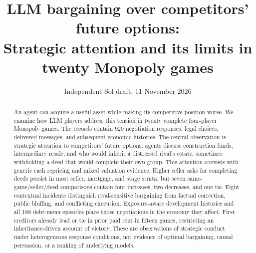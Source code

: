 \documentclass[11pt,letterpaper]{article}
\title{LLM bargaining over competitors' future options:\\Strategic attention and its limits in twenty Monopoly games}
\author{}
\date{Independent Sol draft, 11 November 2026}
\begin{document}



\maketitle
\begin{abstract}
An agent can acquire a useful asset while making its competitive position worse. We examine how LLM players address this tension in twenty complete four-player Monopoly games. The records contain 920 negotiation responses, legal choices, delivered messages, and subsequent economic histories. The central observation is strategic attention to competitors' future options: agents discuss construction funds, intermediary resale, and who would inherit a distressed rival's estate, sometimes withholding a deed that would complete their own group. This attention coexists with generic cash repricing and mixed valuation evidence. Higher seller asks for completing deeds persist in most seller, mortgage, and stage strata, but seven same-game/seller/deed comparisons contain four increases, two decreases, and one tie. Eight contextual incidents distinguish rival-sensitive bargaining from factual correction, public bluffing, and conflicting execution. Exposure-aware development histories and all 188 debt-menu episodes place those negotiations in the economy they affect. First creditors already lead or tie in prior paid rent in fifteen games, restricting an inheritance-driven account of victory. These are observations of strategic conduct under heterogeneous response conditions, not evidence of optimal bargaining, causal persuasion, or a ranking of underlying models.
\end{abstract}





\begingroup\small\endgroup
\clearpage\appendix

\end{document}

